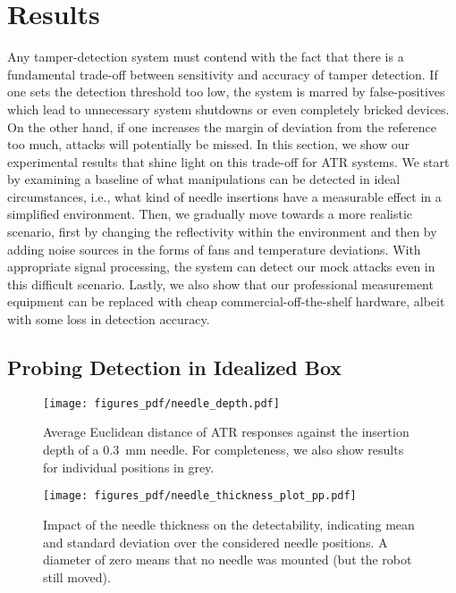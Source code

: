 \documentclass[conference]{IEEEtran}
\begin{document}
\section{Results} 
Any tamper-detection system must contend with the fact that there is a fundamental trade-off between sensitivity and accuracy of tamper detection. If one sets the detection threshold too low, the system is marred by false-positives which lead to unnecessary system shutdowns or even completely bricked devices. On the other hand, if one increases the margin of deviation from the reference too much, attacks will potentially be missed. In this section, we show our experimental results that shine light on this trade-off for ATR systems. 
We start by examining a baseline of what manipulations can be detected in ideal circumstances, i.e., what kind of needle insertions have a measurable effect in a simplified environment. Then, we gradually move towards a more realistic scenario, first by changing the reflectivity within the environment and then by adding noise sources in the forms of fans and temperature deviations. With appropriate signal processing, the system can detect our mock attacks even in this difficult scenario. Lastly, we also show that our professional measurement equipment can be replaced with cheap commercial-off-the-shelf hardware, albeit with some loss in detection accuracy.




\subsection{Probing Detection in Idealized Box}
\label{sec:probing_ideal_box}

\begin{figure}
\centering
\texttt{[image: figures\_pdf/needle\_depth.pdf]}
\caption{Average Euclidean distance of ATR responses against the insertion depth of a \SI{0.3}{\mm} needle. For completeness, we also show results for individual positions in grey.}
\label{fig:idealized_depth}
\end{figure}

\begin{figure}
\centering
\texttt{[image: figures\_pdf/needle\_thickness\_plot\_pp.pdf]}
\caption{Impact of the needle thickness on the detectability, indicating mean and standard deviation over the considered needle positions. A diameter of zero means that no needle was mounted (but the robot still moved).}
\label{fig:idealized_thickness}
\end{figure}
\end{document}
